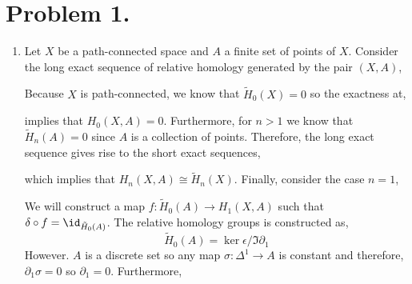 \documentclass[12pt]{extarticle}
\begin{document}

 
\section*{Problem 1.}

\begin{enumerate}
\item Let $X$ be a path-connected space and $A$ a finite set of points of $X$. Consider the long exact sequence of relative homology generated by the pair $(X, A)$,
\begin{center}
\end{center} 
Because $X$ is path-connected, we know that $\tilde{H}_0(X) = 0$ so the exactness at,
\begin{center}
\end{center}
implies that $H_0(X, A) = 0$. Furthermore, for $n > 1$ we know that $\tilde{H}_n(A) = 0$ since $A$ is a collection of points. Therefore, the long exact sequence gives rise to the short exact sequences,
\begin{center}
\end{center}
which implies that $H_n(X, A) \cong \tilde{H}_n(X)$. Finally, consider the case $n = 1$, 
\begin{center}
\end{center}
We will construct a map $f : \tilde{H}_0(A) \to H_1(X, A)$ such that $\delta \circ f = \id_{\tilde{H}_0(A)}$. The relative homology groups is constructed as,
\[ \tilde{H}_0(A) = \ker{\epsilon} / \Im{\partial_1} \]
However. $A$ is a discrete set so any map $\sigma : \Delta^1 \to A$ is constant and therefore, $\partial_1 \sigma = 0$ so $\partial_1 = 0$. Furthermore,

\end{enumerate}
\end{document}
